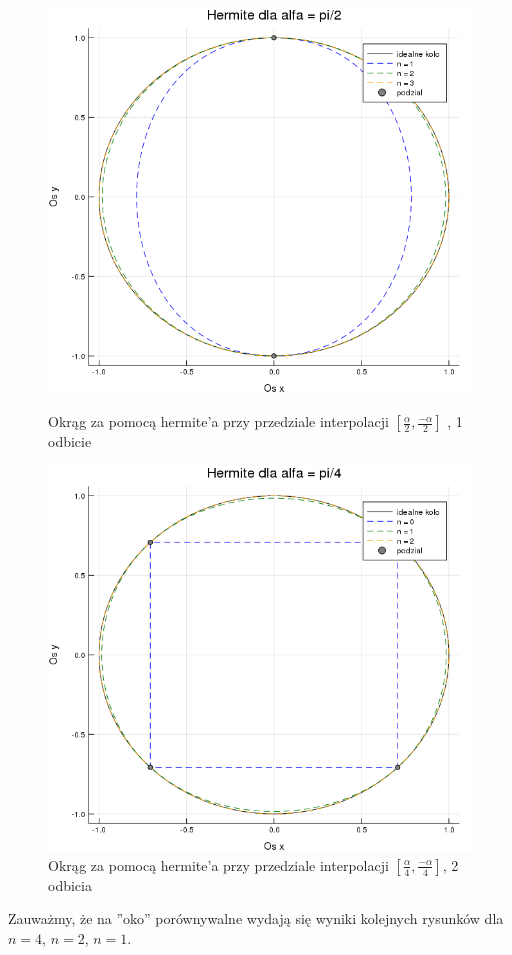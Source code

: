 \documentclass[paper=a4, fontsize=11pt]{scrartcl} %
\numberwithin{equation}{section} %
\numberwithin{figure}{section} %
\numberwithin{table}{section} %
\begin{document}
\begin{figure}[h!]
\centering
 \includegraphics[width=0.8\linewidth]{hermitedwa.png}
  \caption{Okrąg za pomocą hermite'a przy przedziale interpolacji $[\frac{\alpha}{2}, \frac{-\alpha}{2}]$ , 1 odbicie}
  \label{hermitedwa}

 \includegraphics[width=0.8\linewidth]{hermitetrzy.png}
  \caption{Okrąg za pomocą hermite'a przy przedziale interpolacji $[\frac{\alpha}{4}, \frac{-\alpha}{4}]$, 2 odbicia}
  \label{hermitetrzy}
\end{figure}

\FloatBarrier
Zauważmy, że na ''oko'' porównywalne wydają się wyniki kolejnych rysunków dla $n = 4$, $n=2$, $n=1$. 
\end{document}
